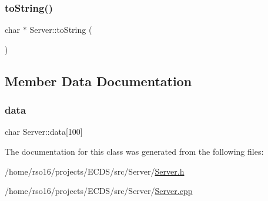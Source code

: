 \subsubsection{\texorpdfstring{to\+String()}{toString()}}
{\footnotesize\ttfamily char $\ast$ Server\+::to\+String (\begin{DoxyParamCaption}{ }\end{DoxyParamCaption})}



\subsection{Member Data Documentation}
\mbox{\label{classServer_a511bae2c5604c196eb714c798fdf709d}} 
\subsubsection{\texorpdfstring{data}{data}}
{\footnotesize\ttfamily char Server\+::data\mbox{[}100\mbox{]}}



The documentation for this class was generated from the following files\+:\begin{DoxyCompactItemize}
\item 
/home/rso16/projects/\+E\+C\+D\+S/src/\+Server/\hyperlink{Server_8h}{Server.\+h}\item 
/home/rso16/projects/\+E\+C\+D\+S/src/\+Server/\hyperlink{Server_8cpp}{Server.\+cpp}\end{DoxyCompactItemize}
